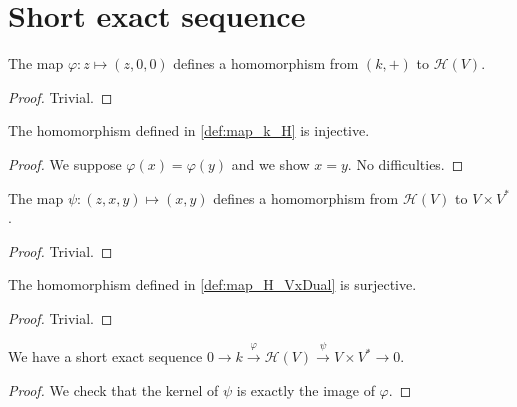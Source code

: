 \section{Short exact sequence}

\begin{definition}
    \label{def:map_k_H}
    \leanok 

    The map $\varphi:z\mapsto (z,0,0)$ defines a homomorphism from
    $(k,+)$ to $\mathcal{H}(V)$.
    \begin{proof}
        \leanok
        Trivial.
    \end{proof}
\end{definition}

\begin{proposition}
    \label{prop:inj_map_k_H}
    \leanok 

    The homomorphism defined in \ref{def:map_k_H} is injective.
\end{proposition}
\begin{proof}
    \leanok
    We suppose $\varphi(x)=\varphi(y)$ and we show $x=y$. No difficulties.
\end{proof}

\begin{definition}
    \label{def:map_H_VxDual}
    \leanok 

    The map $\psi:(z,x,y)\mapsto (x,y)$ defines a homomorphism from 
    $\mathcal{H}(V)$ to $V\times V^*$.
    \begin{proof}
        \leanok
        Trivial.
    \end{proof}
\end{definition}

\begin{proposition}
    \label{prop:surj_map_H_VxDual}
    \leanok 

    The homomorphism defined in \ref{def:map_H_VxDual} is surjective.
\end{proposition}
\begin{proof}
    \leanok
    Trivial.
\end{proof}

\begin{proposition}
    \label{exact_seq_h}
    \leanok 

    We have a short exact sequence $0\rightarrow k \stackrel{\varphi}{\rightarrow} \mathcal{H}(V) \stackrel{\psi}{\rightarrow}
    V\times V^* \rightarrow 0$.
\end{proposition}
\begin{proof}
    \leanok
    We check that the kernel of $\psi$ is exactly the image of $\varphi$.
\end{proof}

